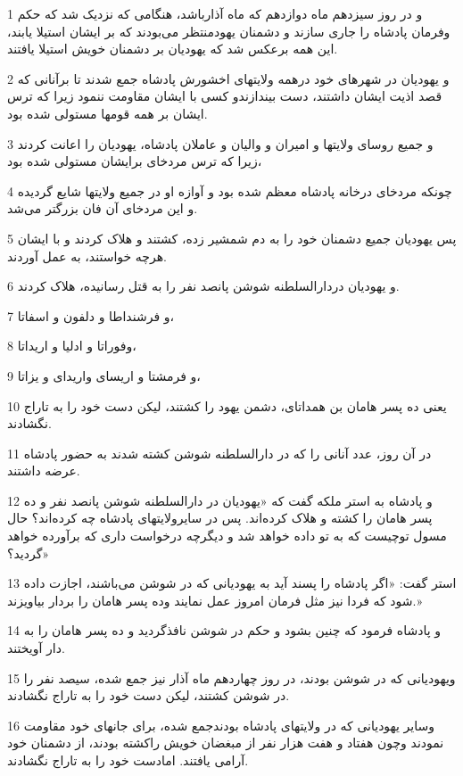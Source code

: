 \par 1 و در روز سیزدهم ماه دوازدهم که ماه آذارباشد، هنگامی که نزدیک شد که حکم وفرمان پادشاه را جاری سازند و دشمنان یهودمنتظر می‌بودند که بر ایشان استیلا یابند، این همه برعکس شد که یهودیان بر دشمنان خویش استیلا یافتند.
\par 2 و یهودیان در شهرهای خود درهمه ولایتهای اخشورش پادشاه جمع شدند تا برآنانی که قصد اذیت ایشان داشتند، دست بیندازندو کسی با ایشان مقاومت ننمود زیرا که ترس ایشان بر همه قومها مستولی شده بود.
\par 3 و جمیع روسای ولایتها و امیران و والیان و عاملان پادشاه، یهودیان را اعانت کردند زیرا که ترس مردخای برایشان مستولی شده بود،
\par 4 چونکه مردخای درخانه پادشاه معظم شده بود و آوازه او در جمیع ولایتها شایع گردیده و این مردخای آن فان بزرگتر می‌شد.
\par 5 پس یهودیان جمیع دشمنان خود را به دم شمشیر زده، کشتند و هلاک کردند و با ایشان هرچه خواستند، به عمل آوردند.
\par 6 و یهودیان دردارالسلطنه شوشن پانصد نفر را به قتل رسانیده، هلاک کردند.
\par 7 و فرشنداطا و دلفون و اسفاتا،
\par 8 وفوراتا و ادلیا و اریداتا،
\par 9 و فرمشتا و اریسای واریدای و یزاتا،
\par 10 یعنی ده پسر هامان بن همداتای، دشمن یهود را کشتند، لیکن دست خود را به تاراج نگشادند.
\par 11 در آن روز، عدد آنانی را که در دارالسلطنه شوشن کشته شدند به حضور پادشاه عرضه داشتند.
\par 12 و پادشاه به استر ملکه گفت که «یهودیان در دارالسلطنه شوشن پانصد نفر و ده پسر هامان را کشته و هلاک کرده‌اند. پس در سایرولایتهای پادشاه چه کرده‌اند؟ حال مسول توچیست که به تو داده خواهد شد و دیگر‌چه درخواست داری که برآورده خواهد گردید؟»
\par 13 استر گفت: «اگر پادشاه را پسند آید به یهودیانی که در شوشن می‌باشند، اجازت داده شود که فردا نیز مثل فرمان امروز عمل نمایند وده پسر هامان را بردار بیاویزند.»
\par 14 و پادشاه فرمود که چنین بشود و حکم در شوشن نافذگردید و ده پسر هامان را به دار آویختند.
\par 15 ویهودیانی که در شوشن بودند، در روز چهاردهم ماه آذار نیز جمع شده، سیصد نفر را در شوشن کشتند، لیکن دست خود را به تاراج نگشادند.
\par 16 وسایر یهودیانی که در ولایتهای پادشاه بودندجمع شده، برای جانهای خود مقاومت نمودند وچون هفتاد و هفت هزار نفر از مبغضان خویش راکشته بودند، از دشمنان خود آرامی یافتند. امادست خود را به تاراج نگشادند.
